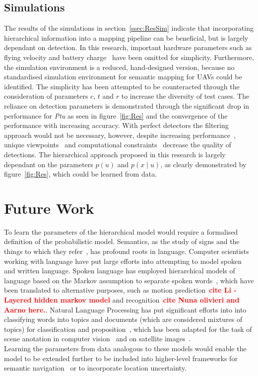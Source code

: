 \documentclass[twocolumn,letterpaper]{IEEEAerospaceCLS}  %
\newcommand\todo[1]{\textbf{\textcolor{red}{#1}}}
\begin{document}
\subsection{Simulations} \label{ssec:DiscSim}
The results of the simulations in section~\ref{ssec:ResSim} indicate that incorporating hierarchical information into a mapping pipeline can be beneficial, but is largely dependant on detection. In this research, important hardware parameters such as flying velocity and battery charge~\cite{boroujerdian_mavbench_2018} have been omitted for simplicity. Furthermore, the simulation environment is a reduced, hand-designed version, because no standardised simulation environment for semantic mapping for UAVs could be identified. The simplicity has been attempted to be counteracted through the consideration of parameters $c$, $t$ and $r$ to increase the diversity of test cases.   
The reliance on detection parameters is demonstrated through the significant drop in performance for \emph{Ptu} as seen in figure~\ref{fig:Res} and the convergence of the performance with increasing accuracy. With perfect detectors the filtering approach would not be necessary, however, despite increasing performance~\cite{alom_history_2018}, unique viewpoints~\cite{richardwebster_psyphy:_2019} and computational constraints~\cite{krishnan_sky_2020} decrease the quality of detections. The hierarchical approach proposed in this research is largely dependant on the parameters $p(u)$ and $p(x\mid u)$, as clearly demonstrated by figure~\ref{fig:Res}, which could be learned from data.
\section{Future Work} \label{sec:Fut}
To learn the parameters of the hierarchical model would require a formalised definition of the probabilistic model. Semantics, as the study of signs and the things to which they refer~\cite{kostavelis_semantic_2015}, has profound roots in language. Computer scientists working with language have put large efforts into attempting to model spoken and written language. Spoken language has employed hierarchical models of language based on the Markov assumption to separate spoken words~\cite{fine_hierarchical_1998,murphy_dynamic_2002}, which have been translated to alternative purposes, such as motion prediction~\todo{cite Li - Layered hidden markov model} and recognition~\todo{cite Nuna olivieri and Aarno here.}. Natural Language Processing has put significant efforts into into classifying words into topics and documents (which are considered mixtures of topics) for classification and proposition~\cite{blei_latent_2003,hofmann_unsupervised_2001}, which has been adapted for the task of scene anotation in computer vision~\cite{bosch_scene_2006,fei-fei_bayesian_2005} and on satellite images~\cite{lienou_semantic_2010}.\\
Learning the parameters from data analogous to these models would enable the model to be extended further to be included into higher-level frameworks for semantic navigation~\cite{mandel_towards_2020} or to incorporate location uncertainty.\\
\end{document}
